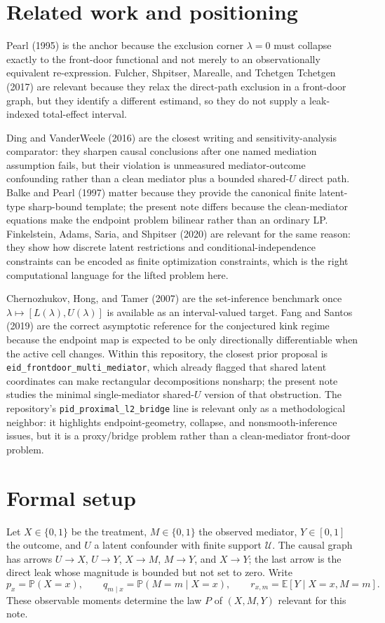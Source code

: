 \documentclass[11pt]{article}
\newcommand{\E}{\mathbb{E}}
\renewcommand{\Pr}{\mathbb{P}}
\theoremstyle{definition}
\theoremstyle{plain}
\theoremstyle{remark}
\begin{document}
\section{Related work and positioning}
Pearl (1995) is the anchor because the exclusion corner \(\lambda=0\) must collapse
exactly to the front-door functional and not merely to an observationally equivalent
re-expression. Fulcher, Shpitser, Marealle, and Tchetgen Tchetgen (2017) are relevant
because they relax the direct-path exclusion in a front-door graph, but they identify a
different estimand, so they do not supply a leak-indexed total-effect interval.

Ding and VanderWeele (2016) are the closest writing and sensitivity-analysis comparator:
they sharpen causal conclusions after one named mediation assumption fails, but their
violation is unmeasured mediator-outcome confounding rather than a clean mediator plus a
bounded shared-\(U\) direct path. Balke and Pearl (1997) matter because they provide the
canonical finite latent-type sharp-bound template; the present note differs because the
clean-mediator equations make the endpoint problem bilinear rather than an ordinary LP.
Finkelstein, Adams, Saria, and Shpitser (2020) are relevant for the same reason: they
show how discrete latent restrictions and conditional-independence constraints can be
encoded as finite optimization constraints, which is the right computational language for
the lifted problem here.

Chernozhukov, Hong, and Tamer (2007) are the set-inference benchmark once
\(\lambda\mapsto[L(\lambda),U(\lambda)]\) is available as an interval-valued target.
Fang and Santos (2019) are the correct asymptotic reference for the conjectured kink
regime because the endpoint map is expected to be only directionally differentiable when
the active cell changes. Within this repository, the closest prior proposal is
\texttt{eid\_frontdoor\_multi\_mediator}, which already flagged that shared latent
coordinates can make rectangular decompositions nonsharp; the present note studies the
minimal single-mediator shared-\(U\) version of that obstruction. The repository's
\texttt{pid\_proximal\_l2\_bridge} line is relevant only as a methodological neighbor:
it highlights endpoint-geometry, collapse, and nonsmooth-inference issues, but it is a
proxy/bridge problem rather than a clean-mediator front-door problem.

\section{Formal setup}
\label{sec:setup}
Let \(X\in\{0,1\}\) be the treatment, \(M\in\{0,1\}\) the observed mediator,
\(Y\in[0,1]\) the outcome, and \(U\) a latent confounder with finite support
\(\mathcal U\). The causal graph has arrows \(U\to X\), \(U\to Y\), \(X\to M\),
\(M\to Y\), and \(X\to Y\); the last arrow is the direct leak whose magnitude is
bounded but not set to zero. Write
\[
  p_x=\Pr(X=x),\qquad q_{m\mid x}=\Pr(M=m\mid X=x),\qquad
  r_{x,m}=\E[Y\mid X=x,M=m].
\]
These observable moments determine the law \(P\) of \((X,M,Y)\) relevant for this
note.
\end{document}
